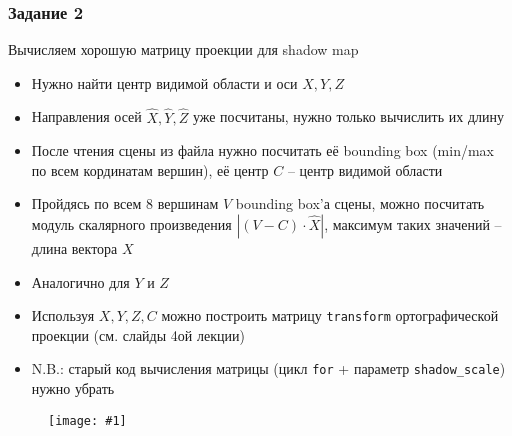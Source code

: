 \documentclass{beamer}
\newcommand{\slideimage}[1]{
  \begin{figure}
    \begin{adjustbox}{width=\textwidth, totalheight=\textheight-2\baselineskip-2\baselineskip,keepaspectratio}
      \texttt{[image: \#1]}
    \end{adjustbox}
  \end{figure}
}
\begin{document}
\begin{frame}[fragile]
\frametitle{Задание 2}
Вычисляем хорошую матрицу проекции для shadow map
\begin{itemize}
\item Нужно найти центр видимой области и оси \begin{math}X, Y, Z\end{math}
\item Направления осей \begin{math}\hat X, \hat Y, \hat Z\end{math} уже посчитаны, нужно только вычислить их длину
\item После чтения сцены из файла нужно посчитать её bounding box (min/max по всем кординатам вершин), её центр \begin{math}C\end{math} -- центр видимой области
\item Пройдясь по всем 8 вершинам \begin{math}V\end{math} bounding box'а сцены, можно посчитать модуль скалярного произведения \begin{math}|(V - C) \cdot \hat X|\end{math}, максимум таких значений -- длина вектора \begin{math}X\end{math}
\item Аналогично для \begin{math}Y\end{math} и \begin{math}Z\end{math}
\item Используя \begin{math}X,Y,Z,C\end{math} можно построить матрицу \verb|transform| ортографической проекции (см. слайды 4ой лекции)
\item N.B.: старый код вычисления матрицы (цикл \verb|for| + параметр \verb|shadow_scale|) нужно убрать
\end{itemize}
\end{frame}

\begin{frame}[fragile]
\slideimage{2.png}
\end{frame}
\end{document}
